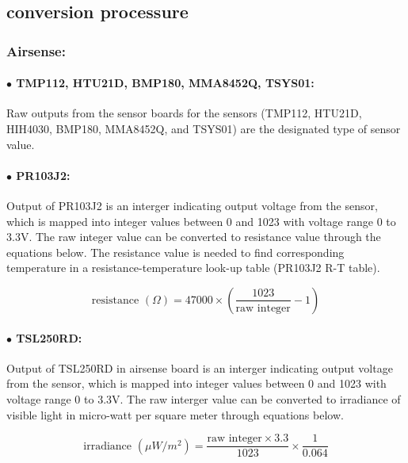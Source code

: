 \subsection{conversion processure}
\subsubsection{Airsense:}
\paragraph{$\bullet$ TMP112, HTU21D, BMP180, MMA8452Q, TSYS01:} \label{ssec:first}
Raw outputs from the sensor boards for the sensors (TMP112, HTU21D, HIH4030, BMP180, MMA8452Q, and TSYS01) are the designated type of sensor value.

\paragraph{$\bullet$ PR103J2:}
Output of PR103J2 is an interger indicating output voltage from the sensor, which is mapped into integer values between 0 and 1023 with voltage range 0 to 3.3V. The raw integer value can be converted to resistance value through the equations below. The resistance value is needed to find corresponding temperature in a resistance-temperature look-up table (PR103J2 R-T table).

{\centering
 \[ \text{resistance } (\Omega) = 47000 \times \left(\frac{1023}{\text{raw integer}} - 1\right) \]
 \par
 }

\paragraph{$\bullet$ TSL250RD:}

Output of TSL250RD in airsense board is an interger indicating output voltage from the sensor, which is mapped into integer values between 0 and 1023 with voltage range 0 to 3.3V. The raw interger value can be converted to irradiance of visible light in micro-watt per square meter through equations below.


{\centering
\[ \text{irradiance } (\mu W/m^2) = \frac{\text{raw integer} \times 3.3}{1023} \times \frac{1}{0.064} \]
\par
}


